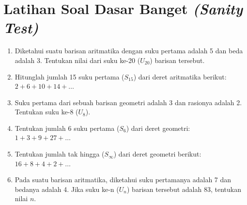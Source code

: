 \documentclass[12pt]{scrartcl}
\begin{document}
\section{Latihan Soal Dasar Banget \textit{(Sanity Test)}}
\begin{enumerate}
    \item Diketahui suatu barisan aritmatika dengan suku pertama adalah 5 dan beda adalah 3. Tentukan nilai dari suku ke-20 ($U_{20}$) barisan tersebut.

    \item Hitunglah jumlah 15 suku pertama ($S_{15}$) dari deret aritmatika berikut:
    $ 2 + 6 + 10 + 14 + \dots $

    \item Suku pertama dari sebuah barisan geometri adalah 3 dan rasionya adalah 2. Tentukan suku ke-8 ($U_8$).

    \item Tentukan jumlah 6 suku pertama ($S_6$) dari deret geometri:
    $ 1 + 3 + 9 + 27 + \dots $

    \item Tentukan jumlah tak hingga ($S_\infty$) dari deret geometri berikut:
    $ 16 + 8 + 4 + 2 + \dots $
    
    \item Pada suatu barisan aritmatika, diketahui suku pertamanya adalah 7 dan bedanya adalah 4. Jika suku ke-n ($U_n$) barisan tersebut adalah 83, tentukan nilai $n$.
\end{enumerate}
\end{document}
